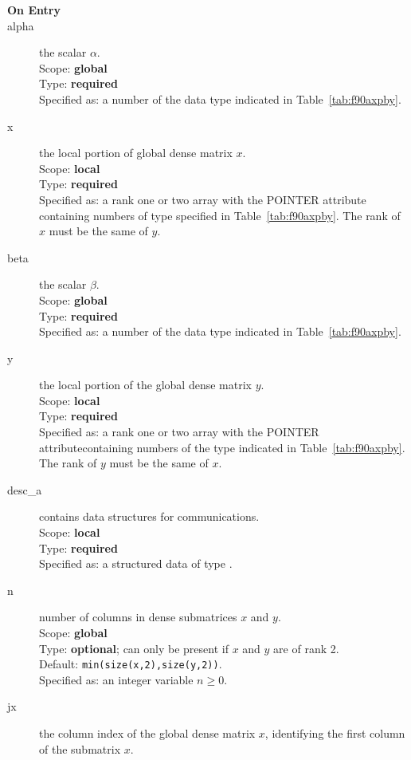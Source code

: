 \begin{description}
\item[\bf On Entry]
\item[alpha] the scalar $\alpha$.\\
Scope: {\bf global} \\
Type: {\bf required} \\
Specified as: a number of the data type indicated in Table~\ref{tab:f90axpby}.
\item[x] the local portion of global dense matrix
$x$.\\
Scope: {\bf local} \\
Type: {\bf required} \\
Specified as: a rank one or two array with the POINTER attribute
containing numbers of type 
specified in Table~\ref{tab:f90axpby}.  The rank of $x$ must be the same of $y$. 
\item[beta] the scalar $\beta$.\\
Scope: {\bf global} \\
Type: {\bf required} \\
Specified as: a number of the data type indicated in Table~\ref{tab:f90axpby}.
\item[y] the local portion of the global dense matrix
$y$. \\
Scope: {\bf local} \\
Type: {\bf required} \\
Specified as:  a rank one or two array with the POINTER
attributecontaining numbers of the type 
indicated in Table~\ref{tab:f90axpby}.  The rank of $y$ must be the same of $x$. 
\item[desc\_a] contains data structures for communications.\\
Scope: {\bf local} \\
Type: {\bf required}\\
Specified as: a structured data of type \descdata.
\item[n] number of columns in dense submatrices $x$ and $y$.\\
Scope: {\bf global} \\
Type: {\bf optional}; can only be present if $x$ and $y$ are of rank 2.\\
Default: \verb|min(size(x,2),size(y,2))|.\\
Specified as: an integer variable $n\ge 0$.
\item[jx]  the column index of the global dense matrix $x$,
identifying the first column of the submatrix $x$.\\

\end{description}
